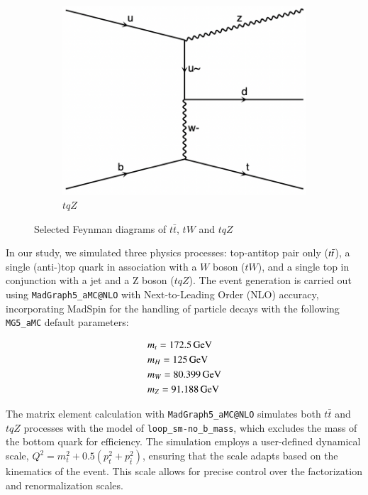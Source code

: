\documentclass[NOTE, REPORT=true, atlasdraft=true, USenglish]{atlasdoc}
\begin{document}
\begin{figure}[htp]
\begin{minipage}{\linewidth}
\begin{subfigure}[t]{0.3\linewidth}
\includegraphics[width=\textwidth]{plots/tqz.png}
\caption{$tqZ$} \label{fig:tqz}
\end{subfigure}
\end{minipage}
\caption{Selected Feynman diagrams of $t\bar{t}$, $tW$ and $tqZ$}
\label{fig:feynman diagrams}
\end{figure}


In our study, we simulated three physics processes: top-antitop pair only ($t\Bar{t}$), a single (anti-)top quark in association with a $W$ boson ($tW$), and a single top in conjunction with a jet and a Z boson ($tqZ$). The event generation is carried out using \texttt{MadGraph5\_aMC@NLO} with Next-to-Leading Order (NLO) accuracy, incorporating MadSpin for the handling of particle decays with the following \texttt{MG5\_aMC} default parameters: 

\begin{align}
    &m_t=172.5 \, \text{GeV} \\ &m_H=125 \, \text{GeV} \\
    &m_W=80.399 \, \text{GeV} \\ &m_Z=91.188 \, \text{GeV}
\end{align}

The matrix element calculation with \texttt{MadGraph5\_aMC@NLO} simulates both $t\bar{t}$ and $tqZ$ processes with the model of \texttt{loop\_sm-no\_b\_mass}, which excludes the mass of the bottom quark for efficiency. The simulation employs a user-defined dynamical scale, $Q^2=m_t^2+0.5(p_t^2+p_{\bar{t}}^2)$, ensuring that the scale adapts based on the kinematics of the event. This scale allows for precise control over the factorization and renormalization scales.
\end{document}
